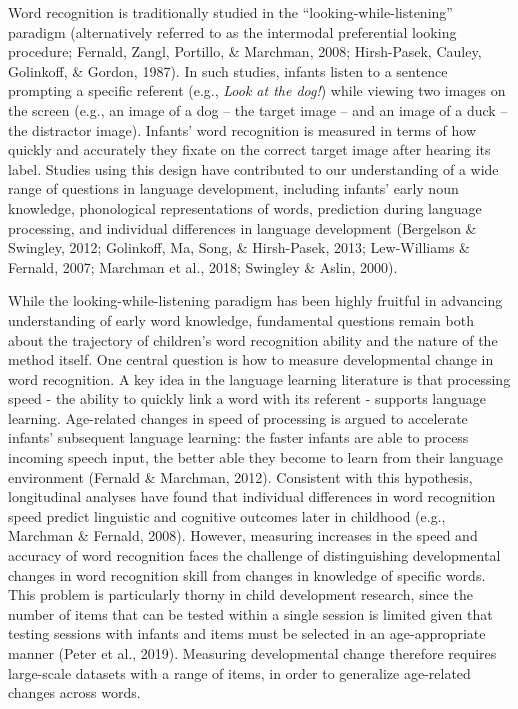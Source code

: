 \documentclass[10pt, letterpaper]{article}
\begin{document}
Word recognition is traditionally studied in the
``looking-while-listening'' paradigm (alternatively referred to as the
intermodal preferential looking procedure; Fernald, Zangl, Portillo, \&
Marchman, 2008; Hirsh-Pasek, Cauley, Golinkoff, \& Gordon, 1987). In
such studies, infants listen to a sentence prompting a specific referent
(e.g., \emph{Look at the dog!}) while viewing two images on the screen
(e.g., an image of a dog -- the target image -- and an image of a duck
-- the distractor image). Infants' word recognition is measured in terms
of how quickly and accurately they fixate on the correct target image
after hearing its label. Studies using this design have contributed to
our understanding of a wide range of questions in language development,
including infants' early noun knowledge, phonological representations of
words, prediction during language processing, and individual differences
in language development (Bergelson \& Swingley, 2012; Golinkoff, Ma,
Song, \& Hirsh-Pasek, 2013; Lew-Williams \& Fernald, 2007; Marchman et
al., 2018; Swingley \& Aslin, 2000).

While the looking-while-listening paradigm has been highly fruitful in
advancing understanding of early word knowledge, fundamental questions
remain both about the trajectory of children's word recognition ability
and the nature of the method itself. One central question is how to
measure developmental change in word recognition. A key idea in the
language learning literature is that processing speed - the ability to
quickly link a word with its referent - supports language learning.
Age-related changes in speed of processing is argued to accelerate
infants' subsequent language learning: the faster infants are able to
process incoming speech input, the better able they become to learn from
their language environment (Fernald \& Marchman, 2012). Consistent with
this hypothesis, longitudinal analyses have found that individual
differences in word recognition speed predict linguistic and cognitive
outcomes later in childhood (e.g., Marchman \& Fernald, 2008). However,
measuring increases in the speed and accuracy of word recognition faces
the challenge of distinguishing developmental changes in word
recognition skill from changes in knowledge of specific words. This
problem is particularly thorny in child development research, since the
number of items that can be tested within a single session is limited
given that testing sessions with infants and items must be selected in
an age-appropriate manner (Peter et al., 2019). Measuring developmental
change therefore requires large-scale datasets with a range of items, in
order to generalize age-related changes across words.
\end{document}

